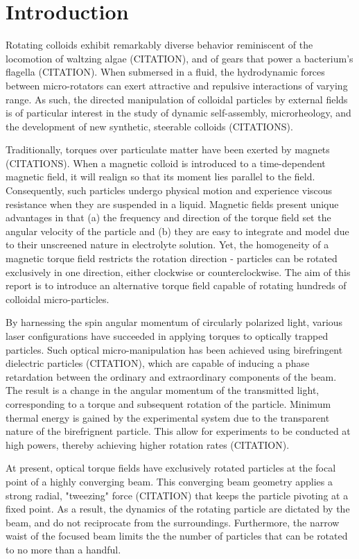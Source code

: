 \documentclass[12pt]{article}
\begin{document}
\section*{Introduction}
Rotating colloids exhibit remarkably diverse behavior reminiscent of the locomotion of waltzing algae (CITATION), and of gears that power a bacterium’s flagella (CITATION). When submersed in a fluid, the hydrodynamic forces between micro-rotators can exert attractive and repulsive interactions of varying range. As such, the directed manipulation of colloidal particles by external fields is of particular interest in the study of dynamic self-assembly, microrheology, and the development of new synthetic, steerable colloids (CITATIONS). 

Traditionally, torques over particulate matter have been exerted by magnets (CITATIONS). When a magnetic colloid is introduced to a time-dependent magnetic field, it will realign so that its moment lies parallel to the field. Consequently, such particles undergo physical motion and experience viscous resistance when they are suspended in a liquid. Magnetic fields present unique advantages in that (a) the frequency and direction of the torque field set the angular velocity of the particle and (b) they are easy to integrate and model due to their unscreened nature in electrolyte solution. Yet, the homogeneity of a magnetic torque field restricts the rotation direction - particles can be rotated exclusively in one direction, either clockwise or counterclockwise.  The aim of this report is to introduce an alternative torque field capable of rotating hundreds of colloidal micro-particles.

By harnessing the spin angular momentum of circularly polarized light, various laser configurations have succeeded in applying torques to optically trapped particles. Such optical micro-manipulation has been achieved using birefringent dielectric particles (CITATION), which are capable of inducing a phase retardation between the ordinary and extraordinary components of the beam. The result is a change in the angular momentum of the transmitted light, corresponding to a torque and subsequent rotation of the particle. Minimum thermal energy is gained by the experimental system due to the transparent nature of the birefrignent particle. This allow for experiments to be conducted at high powers, thereby achieving higher rotation rates (CITATION).

At present, optical torque fields have exclusively rotated particles at the focal point of a highly converging beam. This converging beam geometry applies a strong radial, "tweezing" force (CITATION) that keeps the particle pivoting at a fixed point. As a result, the dynamics of the rotating particle are dictated by the beam, and do not reciprocate from the surroundings. Furthermore, the narrow waist of the focused beam limits the the number of particles that can be rotated to no more than a handful. 
\end{document}
